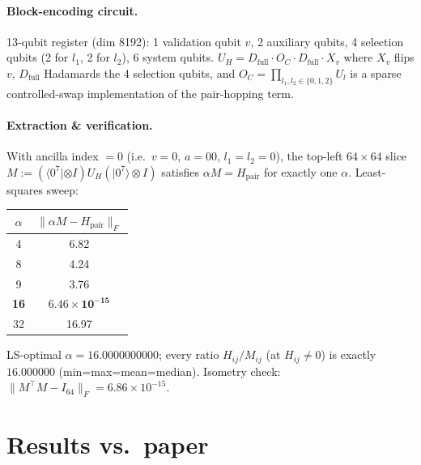 \documentclass[11pt]{article}
\begin{document}
\paragraph{Block-encoding circuit.} 13-qubit register (dim 8192):
1 validation qubit $v$, 2 auxiliary qubits, 4 selection qubits (2 for $l_1$,
2 for $l_2$), 6 system qubits.
$U_H = D_{\text{full}} \cdot O_C \cdot D_{\text{full}} \cdot X_v$ where
$X_v$ flips $v$, $D_{\text{full}}$ Hadamards the 4 selection qubits, and
$O_C = \prod_{l_1,l_2\in\{0,1,2\}} U_l$ is a sparse controlled-swap
implementation of the pair-hopping term.

\paragraph{Extraction \& verification.} With ancilla index $= 0$ (i.e.\ $v{=}0$,
$a{=}00$, $l_1{=}l_2{=}0$), the top-left $64\times 64$ slice
$M := (\langle 0^7|\otimes I)U_H(|0^7\rangle\otimes I)$ satisfies
$\alpha M = H_{\text{pair}}$ for exactly one $\alpha$. Least-squares sweep:

\begin{center}
\begin{tabular}{cc}
\toprule
$\alpha$ & $\|\alpha M - H_{\text{pair}}\|_F$ \\
\midrule
4  & 6.82 \\
8  & 4.24 \\
9  & 3.76 \\
\textbf{16} & $\mathbf{6.46\times 10^{-15}}$ \\
32 & 16.97 \\
\bottomrule
\end{tabular}
\end{center}

LS-optimal $\alpha = 16.0000000000$; every ratio $H_{ij}/M_{ij}$ (at
$H_{ij}\neq 0$) is exactly $16.000000$ (min=max=mean=median). Isometry check:
$\|M^\top M - I_{64}\|_F = 6.86\times 10^{-15}$.

\section{Results vs.\ paper}
\end{document}
